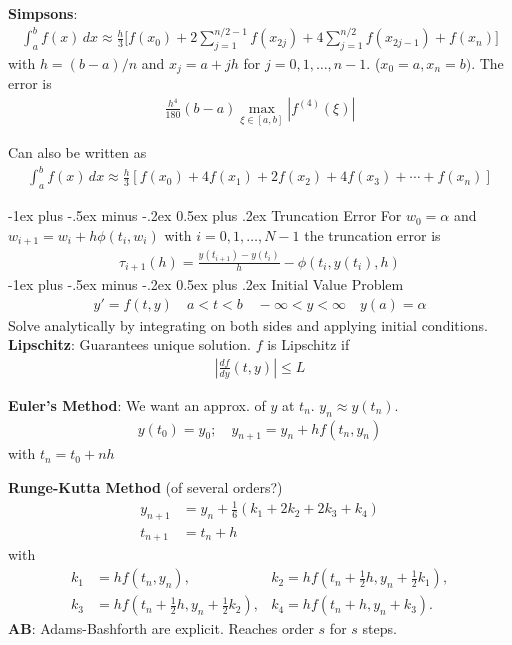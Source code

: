 \documentclass[10pt,landscape]{article}
\makeatletter
\renewcommand{\section}{\@startsection{section}{1}{0mm}%
                                {-1ex plus -.5ex minus -.2ex}%
                                {0.5ex plus .2ex}%
                                {\normalfont\large\bfseries}}
\makeatother
\begin{document}
\begin{multicols}{3}
\textbf{Simpsons}:
\begin{align*}
\int_a^b f(x) \, dx\approx 
\frac{h}{3}\bigg[f(x_0)+2\sum_{j=1}^{n/2-1}f(x_{2j})+
4\sum_{j=1}^{n/2}f(x_{2j-1})+f(x_n)
\bigg]
\end{align*}
with $h=(b-a)/n$ and $x_{j} = a +jh$ for $j=0,1,\ldots,
n-1$. ($x_{0}=a, x_{n}=b)$. The error is
\begin{align*}
  \frac{h^4}{180}(b-a) \max_{\xi\in[a,b]} |f^{(4)}(\xi)|
\end{align*}

Can also be written as
\begin{align*}
\int_a^b f(x) \, dx\approx
\frac{h}{3}[f(x_{0})+4f(x_1)+2f(x_2)+4f(x_3)+\cdots+f(x_n)]
\end{align*}

\section{Truncation Error}
For $w_{0} = \alpha$ and $w_{i+1} = w_{i} + h\phi(t_{i},w_{i})$ with
$i=0,1,\ldots, N-1$ the truncation error is
\begin{align*}
  \tau_{i+1}(h) = \frac{y(t_{i+1}) - y(t_{i})}{h} - \phi(t_{i},y(t_{i}),h)
\end{align*}
\section{Initial Value Problem}
\begin{align*}
  y' = f(t,y) \quad a<t<b \quad -\infty < y < \infty \quad y(a) = \alpha
\end{align*}
Solve analytically by integrating on both sides and applying initial
conditions. 
\textbf{Lipschitz}: Guarantees unique solution. 
$f$ is Lipschitz if
\begin{align*}
  \left|\frac{df}{dy}(t,y)\right| \leq L
\end{align*}

\textbf{Euler's Method}: We want an approx. of $y$ at $t_{n}$. $y_{n} \approx y(t_{n})$.
\begin{align*}
  y(t_{0}) = y_{0}; \quad
  y_{n+1} = y_{n} + h f(t_{n},y_{n})
\end{align*}
with $t_{n} = t_{0} + nh $

\textbf{Runge-Kutta Method} (of several orders?)
\begin{align*}
y_{n+1} &= y_n + \tfrac{1}{6} \left(k_1 + 2k_2 + 2k_3 + k_4 \right)\\
t_{n+1} &= t_n + h
\end{align*} with
\begin{align*}
k_1 &= hf(t_n, y_n),
&k_2 = hf(t_n + \tfrac{1}{2}h , y_n +  \tfrac{1}{2} k_1),
\\
k_3 &= hf(t_n + \tfrac{1}{2}h , y_n +   \tfrac{1}{2} k_2), 
&k_4 = hf(t_n + h , y_n + k_3).
\end{align*}
\textbf{AB}: Adams-Bashforth are explicit. Reaches order $s$ for $s$
steps. 


\end{multicols}
\end{document}
